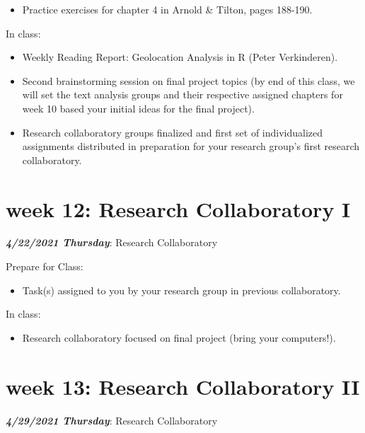 \documentclass[
]{book}
\providecommand{\tightlist}{%
  \setlength{\itemsep}{0pt}\setlength{\parskip}{0pt}}
\begin{document}
\begin{itemize}
\tightlist
\item
  Practice exercises for chapter 4 in Arnold \& Tilton, pages 188-190.
\end{itemize}

In class:

\begin{itemize}
\tightlist
\item
  Weekly Reading Report: Geolocation Analysis in R (Peter Verkinderen).
\item
  Second brainstorming session on final project topics (by end of this class, we will set the text analysis groups and their respective assigned chapters for week 10 based your initial ideas for the final project).
\item
  Research collaboratory groups finalized and first set of individualized assignments distributed in preparation for your research group's first research collaboratory.
\end{itemize}

\hypertarget{week-12-research-collaboratory-i-1}{%
\chapter{week 12: Research Collaboratory I}\label{week-12-research-collaboratory-i-1}}

\textbf{\emph{4/22/2021 Thursday}}: Research Collaboratory

Prepare for Class:

\begin{itemize}
\tightlist
\item
  Task(s) assigned to you by your research group in previous collaboratory.
\end{itemize}

In class:

\begin{itemize}
\tightlist
\item
  Research collaboratory focused on final project (bring your computers!).
\end{itemize}

\hypertarget{week-13-research-collaboratory-ii-1}{%
\chapter{week 13: Research Collaboratory II}\label{week-13-research-collaboratory-ii-1}}

\textbf{\emph{4/29/2021 Thursday}}: Research Collaboratory
\end{document}

